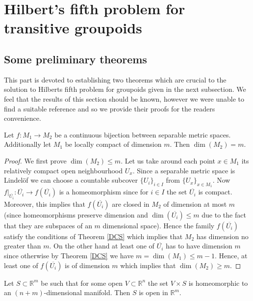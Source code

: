 \section{Hilbert's fifth problem for transitive groupoids}
\subsection{Some preliminary theorems}
This part is devoted to establishing two theorems which are crucial to the solution to Hilberts fifth problem for groupoids given in the next subsection. We feel that the results of this section should be known, however we were unable to find a suitable reference and so we provide their proofs for the readers convenience.
\begin{tw}\label{dim} Let $f\colon M_1\rightarrow M_2$ be a continuous bijection between separable metric spaces. Additionally let $M_1$ be locally compact of dimension $m$. Then $\dim(M_2)=m$.
\begin{proof} We first prove $\dim(M_2)\leq m$. Let us take around each point $x\in M_1$ its relatively compact open neighbourhood $U_x$. Since a separable metric space is Lindel\"{o}f we can choose a countable subcover $\{U_i\}_{i\in I}$ from $\{U_x\}_{x\in M_1}$. Now $f|_{\overline{U_i}}\colon \overline{U_i}\rightarrow f(\overline{U_i})$ is a homeomorphism since for $i\in I$ the set $\overline{U_i}$ is compact. Moreover, this implies that $f(\overline{U_i})$ are closed in $M_2$ of dimension at most $m$ (since homeomorphisms preserve dimension and $\dim(\overline{U_i})\leq m$ due to the fact that they are subspaces of an $m$ dimensional space). Hence the family $f(\overline{U_i})$ satisfy the conditions of Theorem \ref{DCS} which implies that $M_2$ has dimension no greater than $m$. On the other hand at least one of $\overline{U_i}$ has to have dimension $m$ since otherwise by Theorem \ref{DCS} we have $m=\dim(M_1)\leq m-1$. Hence, at least one of $f(\overline{U_i})$ is of dimension $m$ which implies that $\dim(M_2)\geq m$.
\end{proof}
\end{tw}
\begin{tw}\label{Prod1} Let $S\subset\mathbb{R}^m$ be such that for some open $V\subset\mathbb{R}^n$ the set $V\times S$ is homeomorphic to an $(n+m)$-dimensional manifold. Then $S$ is open in $\mathbb{R}^m$.\end{tw}

